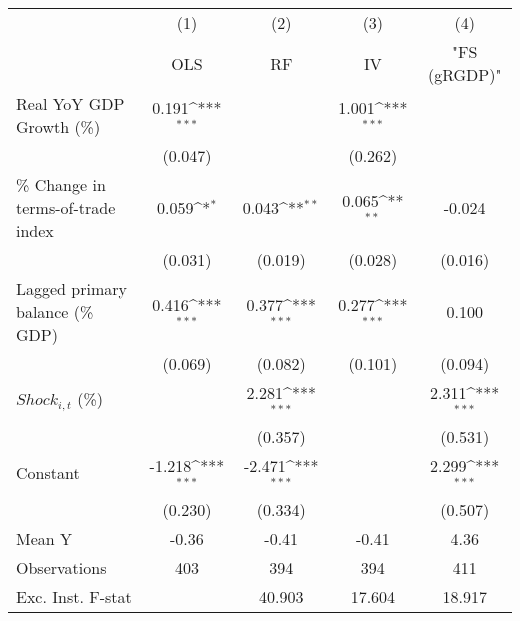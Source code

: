 {
\def\sym#1{\ifmmode^{#1}\else\(^{#1}\)\fi}
\begin{tabular}{l*{4}{c}}
\toprule
                    &\multicolumn{1}{c}{(1)}&\multicolumn{1}{c}{(2)}&\multicolumn{1}{c}{(3)}&\multicolumn{1}{c}{(4)}\\
                    &\multicolumn{1}{c}{OLS}&\multicolumn{1}{c}{RF}&\multicolumn{1}{c}{IV}&\multicolumn{1}{c}{ "FS (gRGDP)" }\\
\midrule
Real YoY GDP Growth (\%)&       0.191\sym{***}&                     &       1.001\sym{***}&                     \\
                    &     (0.047)         &                     &     (0.262)         &                     \\
\addlinespace
\% Change in terms-of-trade index&       0.059\sym{*}  &       0.043\sym{**} &       0.065\sym{**} &      -0.024         \\
                    &     (0.031)         &     (0.019)         &     (0.028)         &     (0.016)         \\
\addlinespace
Lagged primary balance (\% GDP)&       0.416\sym{***}&       0.377\sym{***}&       0.277\sym{***}&       0.100         \\
                    &     (0.069)         &     (0.082)         &     (0.101)         &     (0.094)         \\
\addlinespace
$ Shock_{i,t}$ (\%) &                     &       2.281\sym{***}&                     &       2.311\sym{***}\\
                    &                     &     (0.357)         &                     &     (0.531)         \\
\addlinespace
Constant            &      -1.218\sym{***}&      -2.471\sym{***}&                     &       2.299\sym{***}\\
                    &     (0.230)         &     (0.334)         &                     &     (0.507)         \\
\midrule
Mean Y              &       -0.36         &       -0.41         &       -0.41         &        4.36         \\
Observations        &         403         &         394         &         394         &         411         \\
Exc. Inst. F-stat   &                     &      40.903         &      17.604         &      18.917         \\
\bottomrule
\end{tabular}
}
